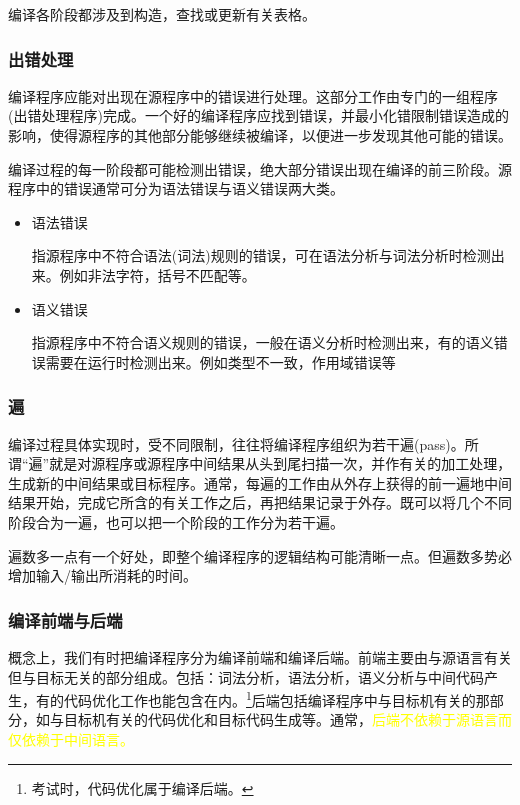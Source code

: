 编译各阶段都涉及到构造，查找或更新有关表格。

\subsubsection{出错处理}

编译程序应能对出现在源程序中的错误进行处理。这部分工作由专门的一组程序(出错处理程序)完成。一个好的编译程序应找到错误，并最小化错限制错误造成的影响，使得源程序的其他部分能够继续被编译，以便进一步发现其他可能的错误。

编译过程的每一阶段都可能检测出错误，绝大部分错误出现在编译的前三阶段。源程序中的错误通常可分为语法错误与语义错误两大类。

\begin{itemize}
    \item 语法错误

          指源程序中不符合语法(词法)规则的错误，可在语法分析与词法分析时检测出来。例如非法字符，括号不匹配等。
    \item 语义错误

          指源程序中不符合语义规则的错误，一般在语义分析时检测出来，有的语义错误需要在运行时检测出来。例如类型不一致，作用域错误等
\end{itemize}

\subsubsection{遍}

编译过程具体实现时，受不同限制，往往将编译程序组织为若干遍(pass)。所谓``遍''就是\textcolor{tip}{对源程序或源程序中间结果从头到尾扫描一次，并作有关的加工处理，生成新的中间结果或目标程序}。通常，每遍的工作由从外存上获得的前一遍地中间结果开始，完成它所含的有关工作之后，再把结果记录于外存。既可以将几个不同阶段合为一遍，也可以把一个阶段的工作分为若干遍。

遍数多一点有一个好处，即整个编译程序的逻辑结构可能清晰一点。但遍数多势必增加输入/输出所消耗的时间。

\subsubsection{\textcolor{imp}{编译前端与后端}}

概念上，我们有时把编译程序分为编译前端和编译后端。前端主要由与源语言有关但与目标无关的部分组成。包括：\textcolor{imp}{词法分析，语法分析，语义分析与中间代码产生，有的代码优化工作也能包含在内。}\footnote{考试时，代码优化属于编译后端。}后端包括编译程序中与目标机有关的那部分，如与目标机有关的\textcolor{imp}{代码优化和目标代码生成等。}通常，\textcolor{mark}{后端不依赖于源语言而仅依赖于中间语言。}


